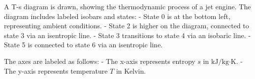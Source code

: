 A T-s diagram is drawn, showing the thermodynamic process of a jet engine. The diagram includes labeled isobars and states:  
- State 0 is at the bottom left, representing ambient conditions.  
- State 2 is higher on the diagram, connected to state 3 via an isentropic line.  
- State 3 transitions to state 4 via an isobaric line.  
- State 5 is connected to state 6 via an isentropic line.  

The axes are labeled as follows:  
- The x-axis represents entropy \( s \) in \( \text{kJ}/\text{kg·K} \).  
- The y-axis represents temperature \( T \) in Kelvin.